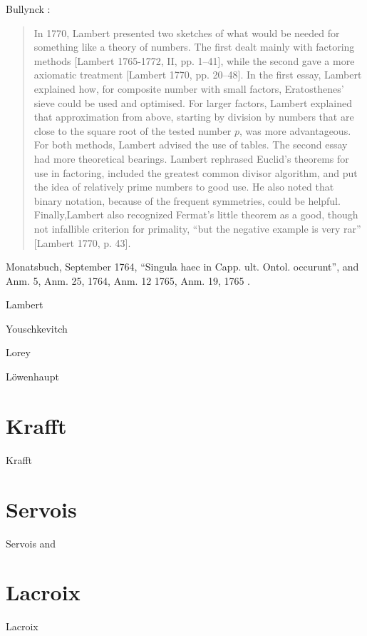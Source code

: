 \documentclass{article}
\begin{document}
Bullynck \cite[pp.~164--165]{bullynck}:

\begin{quote}
In 1770, Lambert presented two sketches of what would be needed for
something like a theory of numbers. The first dealt mainly with factoring methods [Lambert 1765-1772, II, pp. 1–41], while the second gave a
more axiomatic treatment [Lambert 1770, pp. 20–48]. In the first essay,
Lambert explained how, for composite number with small factors, Eratosthenes'
sieve could be used and optimised. For larger factors, Lambert
explained that approximation from above, starting by division by numbers
that are close to the square root of the tested number $p$, was more advantageous.
For both methods, Lambert advised the use of tables. The
second essay had more theoretical bearings. Lambert rephrased Euclid's
theorems for use in factoring, included the greatest common divisor algorithm, and
put the idea of relatively prime numbers to good use. He also
noted that binary notation, because of the frequent symmetries, could be
helpful. Finally,Lambert also recognized Fermat’s little theorem as a good,
though not infallible criterion for primality, ``but the negative example is
very rar'' [Lambert 1770, p. 43]. 
\end{quote}

Monatsbuch, September 1764, ``Singula haec in Capp. ult. Ontol. occurunt'', and Anm. 5, Anm. 25, 1764, Anm. 12 1765, Anm. 19, 1765 \cite{monatsbuch}.

Lambert  \cite[pp.~506--511, \S 875]{anlage}

Youschkevitch \cite{youschkevitch}

Lorey \cite[p.~23]{lorey}

L\"owenhaupt \cite[p.~32]{lowenhaupt}


\section{Krafft}
Krafft \cite[pp.~244--245]{krafft}


\section{Servois}
Servois \cite{servoisessai} and \cite[p.~166]{servois}


\section{Lacroix}
Lacroix \cite[pp.~465--466, \S 1195]{lacroixIII}
\end{document}

